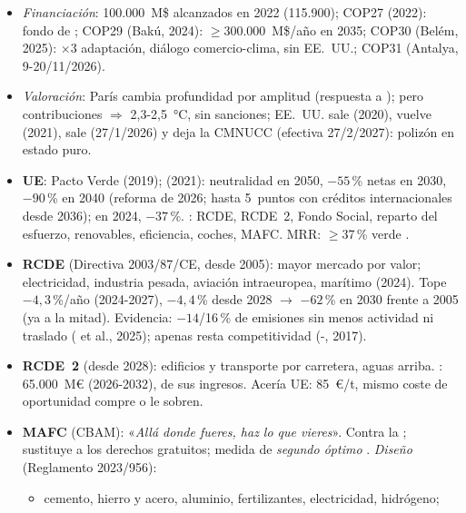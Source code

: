 \documentclass{article}
\begin{document}
\begin{columnas}
\begin{itemize}
\begin{itemize}
  \item art.~6: mercados.
  \end{itemize}
\item \emph{Financiación}: 100.000~M\$ alcanzados en 2022 (115.900); COP27 (2022): fondo de ; COP29 (Bakú, 2024): $\geq$300.000~M\$/año en 2035; COP30 (Belém, 2025): $\times3$ adaptación, diálogo comercio-clima, sin EE.~UU.; COP31 (Antalya, 9-20/11/2026).
\item \emph{Valoración}: París cambia profundidad por amplitud (respuesta a ); pero contribuciones $\Rightarrow$ 2,3-2,5~°C, sin sanciones; EE.~UU. sale (2020), vuelve (2021), sale (27/1/2026) y deja la CMNUCC (efectiva 27/2/2027): polizón en estado puro.
\end{itemize}

\begin{itemize}
\item \textbf{UE}: Pacto Verde (2019);  (2021): neutralidad en 2050, $-55$\,\% netas en 2030, $-90$\,\% en 2040 (reforma de 2026; hasta 5~puntos con créditos internacionales desde 2036); en 2024, $-37$\,\%. : RCDE, RCDE~2, Fondo Social, reparto del esfuerzo, renovables, eficiencia, coches, MAFC. MRR: $\geq$37\,\% verde .
\item \textbf{RCDE} (Directiva 2003/87/CE, desde 2005): mayor mercado por valor; electricidad, industria pesada, aviación intraeuropea, marítimo (2024). Tope $-4{,}3$\,\%/año (2024-2027), $-4{,}4$\,\% desde 2028 $\to$ $-62$\,\% en 2030 frente a 2005 (ya a la mitad). Evidencia: $-14$/16\,\% de emisiones sin menos actividad ni traslado ( et al., 2025); apenas resta competitividad (-, 2017).
\item \textbf{RCDE~2} (desde 2028): edificios y transporte por carretera, aguas arriba. : 65.000~M€ (2026-2032), de sus ingresos. Acería UE: 85~€/t, mismo coste de oportunidad compre o le sobren.
\item \textbf{MAFC} (CBAM): «\emph{Allá donde fueres, haz lo que vieres}». Contra la ; sustituye a los derechos gratuitos; medida de \emph{segundo óptimo} . \emph{Diseño} (Reglamento 2023/956):
  \begin{itemize}
  \item cemento, hierro y acero, aluminio, fertilizantes, electricidad, hidrógeno;

\end{itemize}
\end{itemize}
\end{columnas}
\end{document}
